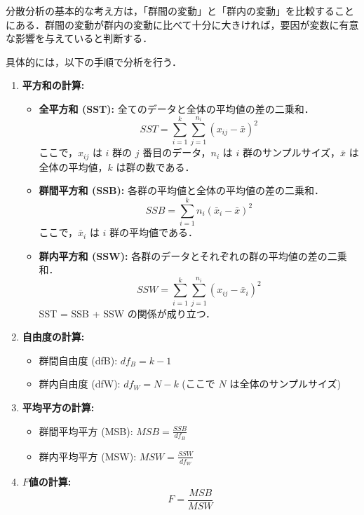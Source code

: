 \documentclass[11pt]{jreport}
\begin{document}
分散分析の基本的な考え方は，「群間の変動」と「群内の変動」を比較することにある．群間の変動が群内の変動に比べて十分に大きければ，要因が変数に有意な影響を与えていると判断する．

具体的には，以下の手順で分析を行う．

\begin{enumerate}
    \item \textbf{平方和の計算:}
    \begin{itemize}
        \item \textbf{全平方和 (SST):} 全てのデータと全体の平均値の差の二乗和．
        \begin{equation}
        SST = \sum_{i=1}^{k} \sum_{j=1}^{n_i} (x_{ij} - \bar{x})^2
        \end{equation}
        ここで，$x_{ij}$ は $i$ 群の $j$ 番目のデータ，$n_i$ は $i$ 群のサンプルサイズ，$\bar{x}$ は全体の平均値，$k$ は群の数である．
        \item \textbf{群間平方和 (SSB):} 各群の平均値と全体の平均値の差の二乗和．
        \begin{equation}
        SSB = \sum_{i=1}^{k} n_i (\bar{x}_i - \bar{x})^2
        \end{equation}
        ここで，$\bar{x}_i$ は $i$ 群の平均値である．
        \item \textbf{群内平方和 (SSW):} 各群のデータとそれぞれの群の平均値の差の二乗和．
        \begin{equation}
        SSW = \sum_{i=1}^{k} \sum_{j=1}^{n_i} (x_{ij} - \bar{x}_i)^2
        \end{equation}
        SST = SSB + SSW の関係が成り立つ．
    \end{itemize}
    \item \textbf{自由度の計算:}
    \begin{itemize}
        \item 群間自由度 (dfB): $df_B = k - 1$
        \item 群内自由度 (dfW): $df_W = N - k$ (ここで $N$ は全体のサンプルサイズ)
    \end{itemize}
    \item \textbf{平均平方の計算:}
    \begin{itemize}
        \item 群間平均平方 (MSB): $MSB = \frac{SSB}{df_B}$
        \item 群内平均平方 (MSW): $MSW = \frac{SSW}{df_W}$
    \end{itemize}
    \item \textbf{$F$値の計算:}
    \begin{equation}
    F = \frac{MSB}{MSW}
    \end{equation}
\end{enumerate}
\end{document}

